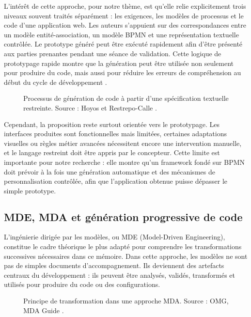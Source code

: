 L'intérêt de cette approche, pour notre thème, est qu'elle relie
explicitement trois niveaux souvent traités séparément : les exigences,
les modèles de processus et le code d'une application web. Les auteurs
s'appuient sur des correspondances entre un modèle entité-association,
un modèle BPMN et une représentation textuelle contrôlée. Le prototype
généré peut être exécuté rapidement afin d'être présenté aux parties
prenantes pendant une séance de validation. Cette logique de prototypage
rapide montre que la génération peut être utilisée non seulement pour
produire du code, mais aussi pour réduire les erreurs de compréhension
au début du cycle de développement \cite{hoyos2017}.

\begin{figure}[H]
\centering
{}
\caption{Processus de génération de code à partir d'une spécification
textuelle restreinte. Source : Hoyos et Restrepo-Calle \cite{hoyos2017}.}
\label{fig:generation-specification-textuelle}
\end{figure}

Cependant, la proposition reste surtout orientée vers le prototypage.
Les interfaces produites sont fonctionnelles mais limitées, certaines
adaptations visuelles ou règles métier avancées nécessitent encore une
intervention manuelle, et le langage restreint doit être appris par le
concepteur. Cette limite est importante pour notre recherche : elle
montre qu'un framework fondé sur BPMN doit prévoir à la fois une
génération automatique et des mécanismes de personnalisation contrôlée,
afin que l'application obtenue puisse dépasser le simple prototype.

\subsection{MDE, MDA et génération progressive de code}

L'ingénierie dirigée par les modèles, ou MDE (Model-Driven Engineering),
constitue le cadre théorique le plus adapté pour comprendre les
transformations successives nécessaires dans ce mémoire. Dans cette
approche, les modèles ne sont pas de simples documents d'accompagnement.
Ils deviennent des artefacts centraux du développement : ils peuvent
être analysés, validés, transformés et utilisés pour produire du code ou
des configurations.

\begin{figure}[H]
\centering
{}
\caption{Principe de transformation dans une approche MDA. Source :
OMG, MDA Guide \cite{omg2014mda}.}
\label{fig:transformation-mda}
\end{figure}

